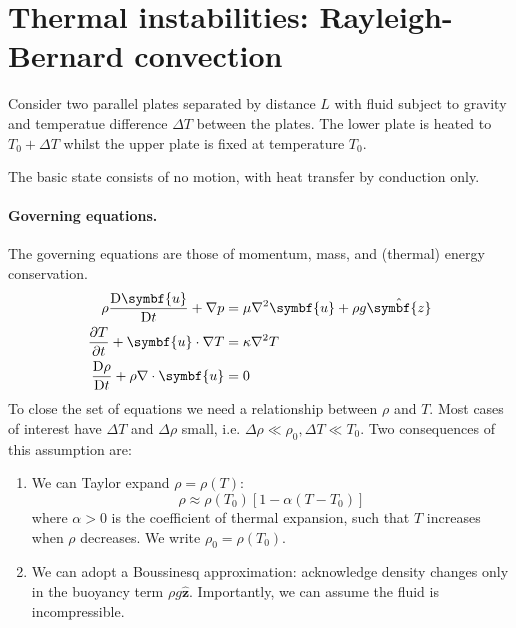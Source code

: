 \documentclass{jknotes}
\renewcommand{\u}{\symbf{u}}
\begin{document}
\section{Thermal instabilities: Rayleigh-Bernard convection}
Consider two parallel plates separated by distance $L$ with fluid subject to
gravity and temperatue difference $\Delta T$ between the plates. The lower
plate is heated to $T_0 + \Delta T$ whilst the upper plate is fixed at
temperature $T_0$. 
\begin{center}
\end{center}

The basic state consists of no motion, with heat transfer by conduction only.
\paragraph{Governing equations.}
The governing equations are those of momentum, mass, and (thermal) energy
conservation.
\begin{align}
	\rho \frac{\diffD \u}{\diffD t} + \nabla p &= \mu \nabla^2 \u + \rho g
	\hat{\symbf{z}} \\
	\frac{\partial T}{\partial t} + \u \cdot \nabla T &= \kappa \nabla^2 T \\
	\frac{\diffD \rho}{\diffD t} + \rho \nabla \cdot \u &= 0
\end{align}
To close the set of equations we need a relationship between $\rho$ and $T$.
Most cases of interest have $\Delta T$ and $\Delta \rho$ small, i.e. $\Delta
\rho \ll \rho_0, \Delta T \ll T_0$. Two consequences of this assumption are:
\begin{enumerate}
	\item We can Taylor expand $\rho = \rho(T)$:
		\begin{equation}
			\rho \approx \rho(T_0) \left[ 1 - \alpha(T-T_0)\right]
		\end{equation}
		where $\alpha > 0$ is the coefficient of thermal expansion, such that
		$T$ increases when $\rho$ decreases. We write $\rho_0 = \rho(T_0)$.
	\item We can adopt a Boussinesq approximation: acknowledge density changes
		only in the buoyancy term $\rho g \hat{\symbf{z}}$. Importantly, we
		can assume the fluid is incompressible.
\end{enumerate}
\end{document}
